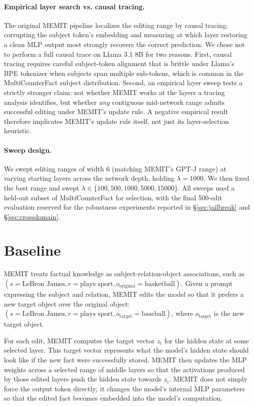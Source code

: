 \documentclass[11pt]{article}
\begin{document}
\paragraph{Empirical layer search vs. causal tracing.}
The original MEMIT pipeline localizes the editing range by causal tracing: corrupting the subject token's embedding and measuring at which layer restoring a clean MLP output most strongly recovers the correct prediction. We chose not to perform a full causal trace on Llama 3.1 8B for two reasons. First, causal tracing requires careful subject-token alignment that is brittle under Llama's BPE tokenizer when subjects span multiple sub-tokens, which is common in the MultiCounterFact subject distribution. Second, an empirical layer sweep tests a strictly stronger claim: not whether MEMIT works at the layers a tracing analysis identifies, but whether \emph{any} contiguous mid-network range admits successful editing under MEMIT's update rule. A negative empirical result therefore implicates MEMIT's update rule itself, not just its layer-selection heuristic.

\paragraph{Sweep design.}
We swept editing ranges of width 6 (matching MEMIT's GPT-J range) at varying starting layers across the network depth, holding $\lambda = 1000$. We then fixed the best range and swept $\lambda \in \{100, 500, 1000, 5000, 15000\}$. All sweeps used a held-out subset of MultiCounterFact for selection, with the final 500-edit evaluation reserved for the robustness experiments reported in \S\ref{sec:jailbreak} and \S\ref{sec:crossdomain}.

\section{Baseline}
MEMIT treats factual knowledge as subject-relation-object associations, such as
\((s=\text{LeBron James}, r=\text{plays sport}, o_{\text{original}}=\text{basketball})\).
Given a prompt expressing the subject and relation, MEMIT edits the model so that it prefers a new target object over the original object:
\((s=\text{LeBron James}, r=\text{plays sport}, o_{\text{target}}=\text{baseball})\),
where \(o_{\text{target}}\) is the new target object.

For each edit, MEMIT computes the target vector \(z_i\) for the hidden state at some selected layer. This target vector represents what the model's hidden state should look like if the new fact were successfully stored. MEMIT then updates the MLP weights across a selected range of middle layers so that the activations produced by those edited layers push the hidden state towards \(z_i\). MEMIT does not simply force the output token directly; it changes the model's internal MLP parameters so that the edited fact becomes embedded into the model's computation.
\end{document}
